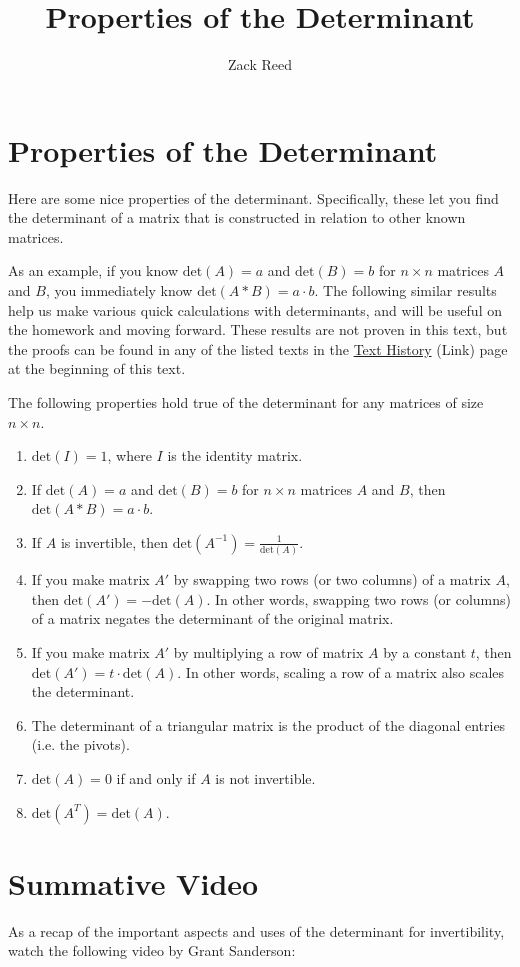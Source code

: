 \documentclass{ximera}
\author{Zack Reed}
\title{Properties of the Determinant}
\begin{document}
\begin{abstract}

\end{abstract}
\maketitle

\section*{Properties of the Determinant}

Here are some nice properties of the determinant. Specifically, these let you find the determinant of a matrix that is constructed in relation to other known matrices. 

As an example, if you know $\mbox{det}(A)=a$ and $\mbox{det}(B)=b$ for $n\times n$ matrices $A$ and $B$, you immediately know $\mbox{det}(A*B)=a\cdot b$. The following similar results help us make various quick calculations with determinants, and will be useful on the homework and moving forward. These results are not proven in this text, but the proofs can be found in any of the listed texts in the \href{https://ximera.osu.edu/appliedlinearalgebra/a1Copyright/learningActivities/m0Copyright/textHistory}{Text History} (Link) page at the beginning of this text.

\begin{theorem}
    The following properties hold true of the determinant for any matrices of size $n\times n$.
    \begin{enumerate}
        \item $\mbox{det}(I)=1$, where $I$ is the identity matrix.
        \item If $\mbox{det}(A)=a$ and $\mbox{det}(B)=b$ for $n\times n$ matrices $A$ and $B$, then $\mbox{det}(A*B)=a\cdot b$.
        \item If $A$ is invertible, then $\mbox{det}(A^{-1})=\frac{1}{\mbox{det}(A)}$.
        \item If you make matrix $A'$ by swapping two rows (or two columns) of a matrix $A$, then $\mbox{det}(A')=-\mbox{det}(A)$. In other words, swapping two rows (or columns) of a matrix negates the determinant of the original matrix. 
        \item If you make matrix $A'$ by multiplying a row of matrix $A$ by a constant $t$, then $\mbox{det}(A')=t\cdot \mbox{det}(A)$. In other words, scaling a row of a matrix also scales the determinant.
        \item The determinant of a triangular matrix is the product of the diagonal entries (i.e. the pivots).
        \item $\mbox{det}(A)=0$ if and only if $A$ is not invertible.
        \item $\mbox{det}(A^T)=\mbox{det}(A)$.
    \end{enumerate}
\end{theorem}

\section*{Summative Video}

As a recap of the important aspects and uses of the determinant for invertibility, watch the following video by Grant Sanderson:

\begin{center}
\end{center}
\end{document}
